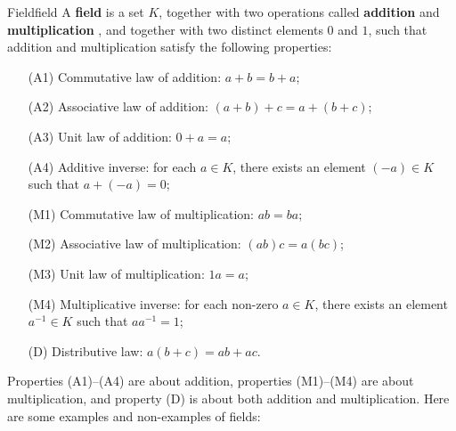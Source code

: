 \begin{definition}{Field}{field}
  A \textbf{field} is a set $K$, together with two
  operations called \textbf{addition}%
   and
  \textbf{multiplication}%
  , and
  together with two distinct elements $0$ and $1$, such that addition
  and multiplication satisfy the following properties:
  \begin{itemize}\setlength\itemsep{0em}
  \item[(A1)] {Commutative law of addition:} $a+b=b+a$;
  \item[(A2)] {Associative law of addition:} $(a+b)+c = a+(b+c)$;
  \item[(A3)] {Unit law of addition:} $0+a = a$;
  \item[(A4)] {Additive inverse:} for each $a\in K$, there exists an element $(-a)\in K$ such that $a+(-a)=0$;
  \item[(M1)] {Commutative law of multiplication:} $ab=ba$;
  \item[(M2)] {Associative law of multiplication:} $(ab)c=a(bc)$;
  \item[(M3)] {Unit law of multiplication:} $1a=a$;
  \item[(M4)] {Multiplicative inverse:} for each non-zero $a\in K$, there exists an element $a^{-1}\in K$ such that $aa^{-1}=1$;
  \item[(D)] {Distributive law:} $a(b+c)=ab+ac$.
  \end{itemize}
\end{definition}

Properties (A1)--(A4) are about addition, properties (M1)--(M4) are
about multiplication, and property (D) is about both addition and
multiplication. Here are some examples and non-examples of fields:

